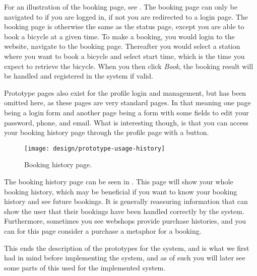 For an illustration of the booking page, see .
The booking page can only be navigated to if you are logged in, if not you are redirected to a login page.
The booking page is otherwise the same as the status page, except you are able to book a bicycle at a given time.
To make a booking, you would login to the website, navigate to the booking page.
Thereafter you would select a station where you want to book a bicycle and select start time, which is the time you expect to retrieve the bicycle.
When you then click \textit{Book}, the booking result will be handled and registered in the system if valid.

Prototype pages also exist for the profile login and management, but has been omitted here, as these pages are very standard pages.
In that meaning one page being a login form and another page being a form with some fields to edit your password, phone, and email.
What is interesting though, is that you can access your booking history page through the profile page with a button.

\begin{figure}[h]
	\centering
	\texttt{[image: design/prototype-usage-history]}
	\caption{Booking history page.}\label{fig:prototype-usage-history}
\end{figure}

The booking history page can be seen in .
This page will show your whole booking history, which may be beneficial if you want to know your booking history and see future bookings.
It is generally reassuring information that can show the user that their bookings have been handled correctly by the system.
Furthermore, sometimes you see webshops provide purchase histories, and you can for this page consider a purchase a metaphor for a booking.

This ends the description of the prototypes for the system, and is what we first had in mind before implementing the system, and as of such you will later see some parts of this used for the implemented system.